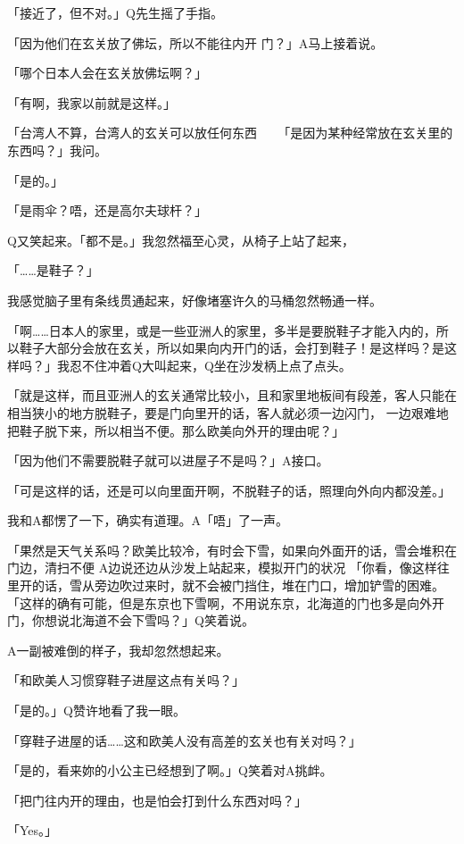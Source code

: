 \documentclass{article}
\begin{document}
「接近了，但不对。」Q先生摇了手指。 

「因为他们在玄关放了佛坛，所以不能往内开
\newpage
门？」A马上接着说。 

「哪个日本人会在玄关放佛坛啊？」 

「有啊，我家以前就是这样。」 

「台湾人不算，台湾人的玄关可以放任何东西
　  「是因为某种经常放在玄关里的东西吗？」我问。 

「是的。」 

「是雨伞？唔，还是高尔夫球杆？」 

Q又笑起来。「都不是。」我忽然福至心灵，从椅子上站了起来， 

「……是鞋子？」 

我感觉脑子里有条线贯通起来，好像堵塞许久的马桶忽然畅通一样。 

「啊……日本人的家里，或是一些亚洲人的家里，多半是要脱鞋子才能入内的，所以鞋子大部分会放在玄关，所以如果向内开门的话，会打到鞋子！是这样吗？是这样吗？」我忍不住冲着Q大叫起来，Q坐在沙发柄上点了点头。 

「就是这样，而且亚洲人的玄关通常比较小，且和家里地板间有段差，客人只能在相当狭小的地方脱鞋子，要是门向里开的话，客人就必须一边闪门，
\newpage
一边艰难地把鞋子脱下来，所以相当不便。那么欧美向外开的理由呢？」 

「因为他们不需要脱鞋子就可以进屋子不是吗？」A接口。 

「可是这样的话，还是可以向里面开啊，不脱鞋子的话，照理向外向内都没差。」 

我和A都愣了一下，确实有道理。A「唔」了一声。 

「果然是天气关系吗？欧美比较冷，有时会下雪，如果向外面开的话，雪会堆积在门边，清扫不便
A边说还边从沙发上站起来，模拟开门的状况
「你看，像这样往里开的话，雪从旁边吹过来时，就不会被门挡住，堆在门口，增加铲雪的困难。
「这样的确有可能，但是东京也下雪啊，不用说东京，北海道的门也多是向外开门，你想说北海道不会下雪吗？」Q笑着说。 

A一副被难倒的样子，我却忽然想起来。 

「和欧美人习惯穿鞋子进屋这点有关吗？」 

「是的。」Q赞许地看了我一眼。 

「穿鞋子进屋的话……这和欧美人没有高差的玄关也有关对吗？」 

\newpage

「是的，看来妳的小公主已经想到了啊。」Q笑着对A挑衅。 

「把门往内开的理由，也是怕会打到什么东西对吗？」 

「Yes。」 
\end{document}
